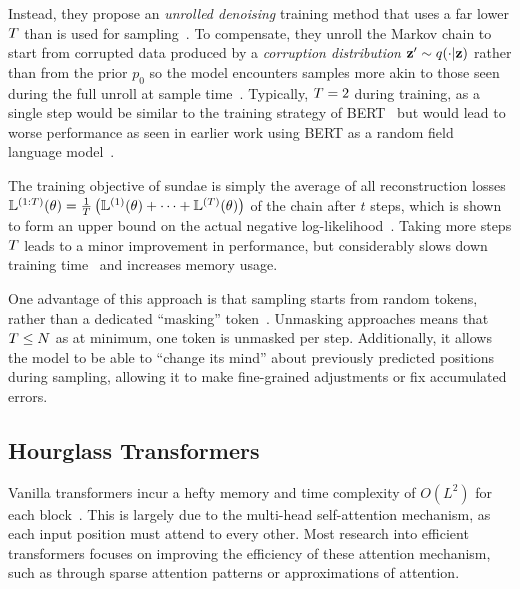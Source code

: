 Instead, they propose an \textit{unrolled denoising} training method that uses a
far lower $T$ than is used for
sampling~\cite{savinov2022stepunrolled}. To compensate, they unroll the Markov
chain to start from corrupted data produced by a \textit{corruption
distribution} $\mathbf{z}' \sim q(\cdot \vert \mathbf{z})$
rather than from the prior $p_0$ so the model encounters samples more akin to
those seen during the full unroll at sample time~\cite{savinov2022stepunrolled}.
Typically, $T = 2$ during training, as a single step would be similar
to the training strategy of BERT~\cite{devlin2019bert} but would lead to worse
performance as seen in earlier work using BERT as a random field language
model~\cite{wang2019bert}.

The training objective of \gls{sundae} is simply the average of all reconstruction
losses $\mathbb{L}^{(1:T)}(\theta) = \frac{1}{T} \left(\mathbb{L}^{(1)}(\theta) + \dots +
\mathbb{L}^{(T)}(\theta) \right)$ of the chain after $t$ steps, which is shown to form
an upper bound on the actual negative
log-likelihood~\cite{savinov2022stepunrolled}. Taking more steps $T$
leads to a minor improvement in performance, but considerably slows down
training time~\cite{savinov2022stepunrolled} and increases memory usage.

One advantage of this approach is that sampling starts from random tokens,
rather than a dedicated ``masking''
token~\cite{bondtaylor2021unleashing,austin2021structured}. Unmasking approaches
means that $T \leq N$ as at minimum, one token is unmasked per step.
Additionally, it allows the model to be able to ``change its mind'' about
previously predicted positions during sampling, allowing it to make fine-grained
adjustments or fix accumulated errors.

\subsection{Hourglass Transformers}
\label{subsec:hourglass}

Vanilla transformers incur a hefty memory and time complexity of $O(L^2)$ for
each block~\cite{vaswani2017attention}. This is largely due to the multi-head
self-attention mechanism, as each input position must attend to every other.
Most research into efficient transformers focuses on improving the efficiency of
these attention mechanism, such as through sparse attention patterns or
approximations of attention.

